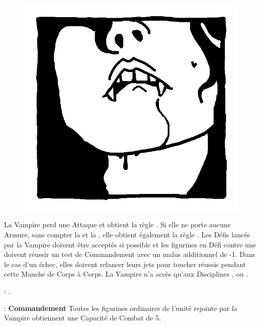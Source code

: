 \newpage
{}

\begin{figure}
\centering
\includegraphics[width=\logosize]{pics/logo_lamia.png}
\end{figure}
La Vampire perd une Attaque et obtient la règle \lightningreflexes{}. Si elle ne porte aucune Armure, sans compter la \mountsprotection{} et la \innatedefence{}, elle obtient également la règle \distracting{}. Les Défis lancés par la Vampire doivent être acceptés si possible et les figurines en Défi contre une \lamia{} doivent réussir un test de Commandement avec un malus additionnel de -1. Dans le cas d'un échec, elles doivent relancer leurs jets pour toucher réussis pendant cette Manche de Corps à Corps. La Vampire n'a accès qu'aux Disciplines \light{}, \shadows{} ou \necromancy{}.

\vspace{0.5cm}
\bloodties{} : \textbf{\courtofthedamned{}}.

\vspace{0.5cm}
\ancientbloodpower{} : \textbf{Commandement}\dotfill{}\newline%
Toutes les figurines ordinaires de l'unité rejointe par la Vampire obtiennent une Capacité de Combat de 5.


